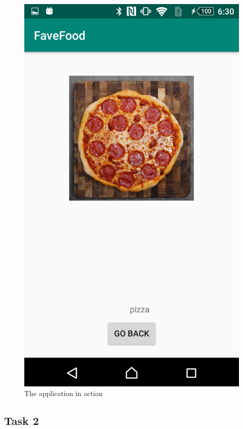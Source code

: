 \documentclass{scrartcl}
\begin{document}
\begin{figure}[h]
    \includegraphics[scale=0.2]{images/screen6.png}
    \caption{The application in action}
\end{figure}

\pagebreak

\subsection*{Task 2}
\end{document}
